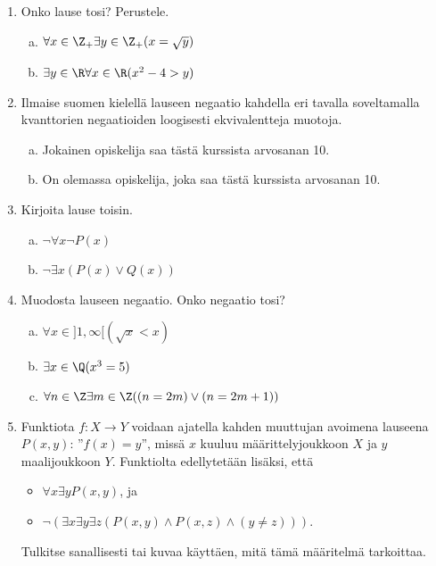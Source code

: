 \begin{enumerate}
\item Onko lause tosi? Perustele.
\begin{enumerate}[a)]
\item $\forall x\in \Z_{+} \exists y\in \Z_{+} (x = \sqrt{y})
$
\item $\exists y\in \R \forall x\in \R (x^2 - 4 > y)$
\end{enumerate}

\item Ilmaise suomen kielellä lauseen negaatio kahdella eri
tavalla soveltamalla kvanttorien negaatioiden loogisesti
ekvivalentteja muotoja.
\begin{enumerate}[a)]
\item Jokainen opiskelija saa tästä kurssista arvosanan 10.
\item On olemassa opiskelija, joka saa tästä kurssista
arvosanan 10.
\end{enumerate}

\item Kirjoita lause toisin.
\begin{enumerate}[a)]
\item $\lnot \forall x \lnot P(x)$
\item $\lnot \exists x (P(x) \lor Q(x))$
\end{enumerate}

\item
Muodosta lauseen negaatio. Onko negaatio tosi?
\begin{enumerate}[a)]
\item $\forall x\in ]1, \infty [ (\sqrt{x} < x)$
\item $\exists x\in \Q (x^3 = 5)$
\item $\forall n \in \Z \exists m \in \Z ((n = 2m) \lor (n =
2m+1))$
\end{enumerate}

\item Funktiota $f\colon X\to Y$ voidaan ajatella kahden
muuttujan avoimena lauseena $P(x, y)$: ''$f(x) = y$'', missä
$x$ kuuluu määrittelyjoukkoon $X$ ja $y$ maalijoukkoon $Y$.
Funktiolta edellytetään lisäksi, että
\begin{itemize}
\item $\forall x \exists y P(x, y)$, ja
\item $\lnot (\exists x \exists y \exists z (P(x, y) \land P(x, z)
\land (y \neq z)))$.
\end{itemize}
Tulkitse sanallisesti tai kuvaa käyttäen, mitä tämä määritelmä
tarkoittaa.

\newpage


\end{enumerate}
